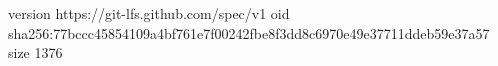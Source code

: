 version https://git-lfs.github.com/spec/v1
oid sha256:77bccc45854109a4bf761e7f00242fbe8f3dd8c6970e49e37711ddeb59e37a57
size 1376
